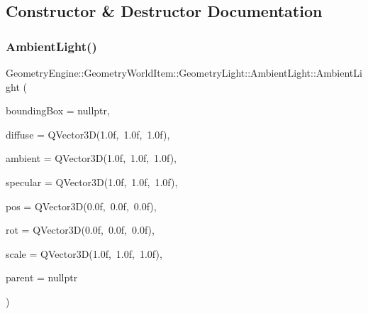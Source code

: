 \subsection{Constructor \& Destructor Documentation}
\mbox{\label{class_geometry_engine_1_1_geometry_world_item_1_1_geometry_light_1_1_ambient_light_af3902ecbb80cd014695d3ecfc35ace18}} 
\subsubsection{\texorpdfstring{AmbientLight()}{AmbientLight()}\hspace{0.1cm}{\footnotesize\ttfamily [1/2]}}
{\footnotesize\ttfamily Geometry\+Engine\+::\+Geometry\+World\+Item\+::\+Geometry\+Light\+::\+Ambient\+Light\+::\+Ambient\+Light (\begin{DoxyParamCaption}\item[{\mbox{\hyperlink{class_geometry_engine_1_1_geometry_world_item_1_1_geometry_item_1_1_geometry_item}{Geometry\+Item\+::\+Geometry\+Item}} $\ast$}]{bounding\+Box = {\ttfamily nullptr},  }\item[{const Q\+Vector3D \&}]{diffuse = {\ttfamily QVector3D(1.0f,~1.0f,~1.0f)},  }\item[{const Q\+Vector3D \&}]{ambient = {\ttfamily QVector3D(1.0f,~1.0f,~1.0f)},  }\item[{const Q\+Vector3D \&}]{specular = {\ttfamily QVector3D(1.0f,~1.0f,~1.0f)},  }\item[{const Q\+Vector3D \&}]{pos = {\ttfamily QVector3D(0.0f,~0.0f,~0.0f)},  }\item[{const Q\+Vector3D \&}]{rot = {\ttfamily QVector3D(0.0f,~0.0f,~0.0f)},  }\item[{const Q\+Vector3D \&}]{scale = {\ttfamily QVector3D(1.0f,~1.0f,~1.0f)},  }\item[{\mbox{\hyperlink{class_geometry_engine_1_1_geometry_world_item_1_1_world_item}{World\+Item}} $\ast$}]{parent = {\ttfamily nullptr} }\end{DoxyParamCaption})}

